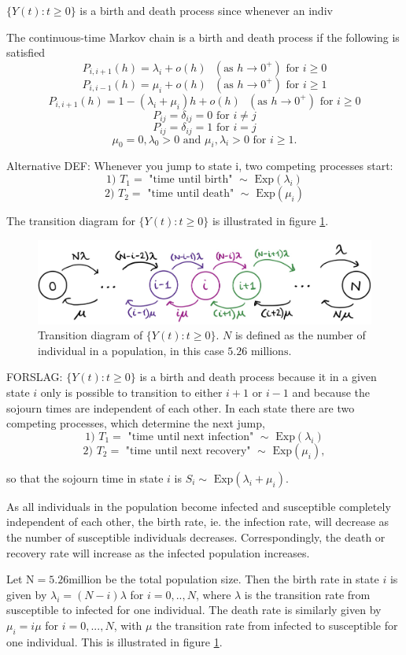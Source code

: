$\{Y(t):t \geq 0\}$ is a birth and death process since whenever an indiv


The continuous-time Markov chain is a birth and death process if the following is satisfied
$$P_{i, i+1}(h) = \lambda_i + o(h) \text{ }(\text{as } h\rightarrow 0^+) \text{ for } i \geq 0$$
$$P_{i, i-1}(h) = \mu_i + o(h) \text{ }(\text{as } h\rightarrow 0^+) \text{ for } i \geq 1$$
$$P_{i, i+1}(h) = 1 - (\lambda_i + \mu_i)h+ o(h) \text{ }(\text{as } h\rightarrow 0^+) \text{ for } i \geq 0$$
$$ P_{ij} = \delta_{ij} = 0 \text{ for } i \neq j $$
$$ P_{ij} = \delta_{ij} = 1 \text{ for } i = j $$
$$\mu_0 = 0, \lambda_0 > 0\text{ and } \mu_i, \lambda_i > 0 \text{ for } i\geq1.$$

Alternative DEF:
Whenever you jump to state i, two competing processes start: 
$$\text{1) } T_1  = \text{ "time until birth" } \sim \text{ Exp}(\lambda_i)$$
$$\text{2) } T_2 = \text{ "time until death" } \sim \text{ Exp}(\mu_i)$$

The transition diagram for $\{Y(t): t\geq 0\}$ is illustrated in figure \ref{transdiagramY}.

\begin{figure}
    \centering
    \includegraphics[width=140mm]{TransDiag1F.png}
    \caption{Transition diagram of $\{Y(t):t \geq 0 \}$. $N$ is defined as the number of individual in a population, in this case $5.26 \text{ millions.}$}
    \label{transdiagramY}
\end{figure}


FORSLAG: $\{Y(t):t \geq 0\}$ is a birth and death process because it in a given state $i$ only is possible to transition to either $i+1$ or $i-1$ and because the sojourn times are independent of each other. In each state there are two competing processes, which determine the next jump,
$$\text{1) } T_1  = \text{ "time until next infection" } \sim \text{ Exp}(\lambda_i)$$
$$\text{2) } T_2 = \text{ "time until next recovery" } \sim \text{ Exp}(\mu_i),$$

so that the sojourn time in state $i$ is $S_i \sim \text{ Exp}(\lambda_i +\mu_i)$.

As all individuals in the population become infected and susceptible completely independent of each other, the birth rate, ie. the infection rate, will decrease as the number of susceptible individuals decreases. Correspondingly, the death or recovery rate will increase as the infected population increases. 

Let $\text{N}=5.26\text{million}$ be the total population size. Then the birth rate in state $i$ is given by $\lambda_i=(N-i)\lambda$ for $i=0,..,N$, where $\lambda$ is the transition rate from susceptible to infected for one individual. The death rate is similarly given by $\mu_i = i\mu$ for $i=0,...,N$, with $\mu$ the transition rate from infected to susceptible for one individual. This is illustrated in figure \ref{transdiagramY}.

